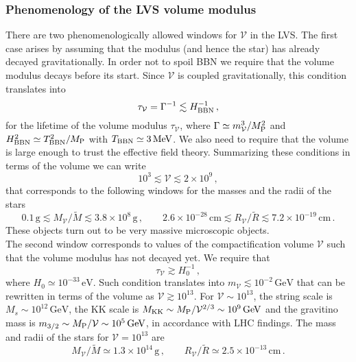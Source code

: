 \documentclass[11pt,a4paper]{article}
\newcommand{\V}{\mathcal{V}}
\begin{document}
\subsubsection*{Phenomenology of the LVS volume modulus}

There are two phenomenologically allowed windows for $\V$ in the LVS. The first case arises by assuming that the modulus (and hence the star) has already decayed gravitationally. In order not to spoil BBN we require that the volume modulus decays before its start. Since $\V$ is coupled gravitationally, this condition translates into
\begin{equation}
\tau_{\V} =\Gamma^{-1} \lesssim H_{\rm BBN}^{-1} \,,
\end{equation}
for the lifetime of the volume modulus $\tau_{\V}$, where $\Gamma \simeq m_{\V}^3/M_{\rm P}^2$ and $H_{\rm BBN}^2 \simeq T_{\rm BBN}^{2}/M_{\rm P}$ with $T_{\rm BBN} \simeq 3 \, \text{MeV}$. We also need to require that the volume is large enough to trust the effective field theory. Summarizing these conditions in terms of the volume we can write
\begin{equation}
10^3 \lesssim \V \lesssim 2 \times 10^{9} \,,
\end{equation}
that corresponds to the following windows for the masses and the radii of the stars
\begin{equation}
0.1 \, \text{g} \lesssim M_{\V}/\tilde{M} \lesssim 3.8 \times 10^8 \, \text{g} \,, \qquad 2.6 \times 10^{-28} \, \text{cm} \lesssim R_{\V}/\tilde{R} \lesssim  7.2 \times 10^{-19} \, \text{cm}\,.
\end{equation}
These objects turn out to be very massive microscopic objects.\\

The second window corresponds to values of the compactification volume $\V$ such that the volume modulus has not decayed yet. We require that
\begin{equation}
\tau_{\V} \gtrsim H_0^{-1}\,,
\end{equation}
where $H_0 \simeq 10^{-33} \, \text{eV}$. Such condition translates into $m_{\V} \lesssim 10^{-2} \, \text{GeV}$ that can be rewritten in terms of the volume as $\V \gtrsim 10^{13}$. For $\mathcal{V} \sim 10^{13}$, the string scale is $M_s \sim 10^{12} \, \text{GeV}$, the KK scale is $M_{\rm KK} \sim M_{\rm P}/\mathcal{V}^{2/3} \sim 10^9 \, \text{GeV}$ and the gravitino mass is $m_{3/2} \sim M_{\rm P}/\V \sim 10^5 \, \text{GeV}$, in accordance with LHC findings. The mass and radii of the stars for $\V = 10^{13}$ are
\begin{equation}
\label{eq:MassSizeNYD}
M_{\V}/{\tilde{M}} \simeq 1.3 \times 10^{14} \, \text{g} \,, \qquad R_{\V}/{\tilde{R}} \simeq 2.5 \times 10^{-13} \, \text{cm}\,.
\end{equation}
\end{document}
